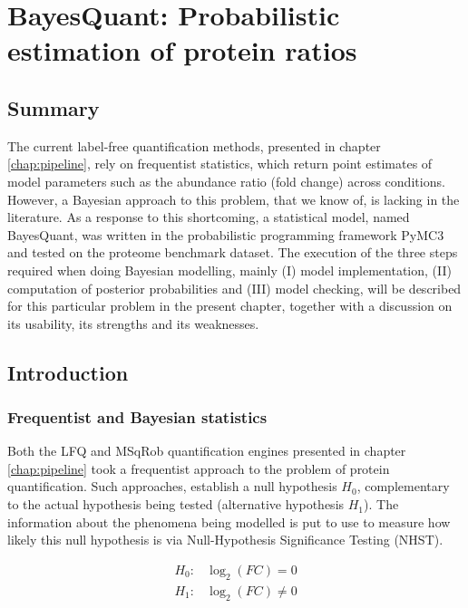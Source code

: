 \chapter{BayesQuant: Probabilistic estimation of protein ratios}
\label{chap:model}

\section*{Summary}

The current label-free quantification methods, presented in chapter \ref{chap:pipeline}, rely on frequentist statistics, which return point estimates of model parameters such as the abundance ratio (fold change) across conditions. However, a Bayesian  approach to this problem, that we know of, is lacking in the literature. As a response to this shortcoming, a statistical model, named BayesQuant, was written in the probabilistic programming framework PyMC3 and tested on the proteome benchmark dataset. The execution of the three steps required when doing Bayesian modelling, mainly (I) model implementation, (II) computation of posterior probabilities and (III) model checking, will be described for this particular problem in the present chapter, together with a discussion on its usability, its strengths and its weaknesses.

\section{Introduction}

\subsection{Frequentist and Bayesian statistics}

Both the LFQ and MSqRob quantification engines presented in chapter \ref{chap:pipeline} took a frequentist approach to the problem of protein quantification. Such approaches, establish a null hypothesis $H_0$, complementary to the actual hypothesis being tested (alternative hypothesis $H_1$). The information about the phenomena being modelled is put to use to measure how likely this null hypothesis is via Null-Hypothesis Significance Testing (\ac{NHST}).


\begin{align}
H_0: & \log_2(FC) = 0 \nonumber \\
H_1: & \log_2(FC) \neq 0 \nonumber
\end{align}

